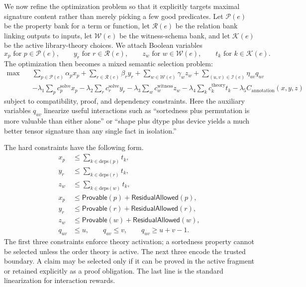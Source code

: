 \documentclass[11pt]{article}
\theoremstyle{definition}
\theoremstyle{plain}
\begin{document}
We now refine the optimization problem so that it explicitly targets maximal
signature content rather than merely picking a few good predicates. Let
\(\mathcal{P}(e)\) be the property bank for a term or function, let
\(\mathcal{R}(e)\) be the relation bank linking outputs to inputs, let
\(\mathcal{W}(e)\) be the witness-schema bank, and let
\(\mathcal{K}(e)\) be the active library-theory choices. We attach Boolean
variables
\[
 x_p \text{ for } p \in \mathcal{P}(e), \qquad
 y_r \text{ for } r \in \mathcal{R}(e), \qquad
 z_w \text{ for } w \in \mathcal{W}(e), \qquad
 t_k \text{ for } k \in \mathcal{K}(e).
\]
The optimization then becomes a mixed semantic selection problem:
\begin{align*}
\max \quad &
\sum_{p \in \mathcal{P}(e)} \alpha_p x_p
+ \sum_{r \in \mathcal{R}(e)} \beta_r y_r
+ \sum_{w \in \mathcal{W}(e)} \gamma_w z_w
+ \sum_{(u,v) \in \mathcal{I}(e)} \eta_{uv} q_{uv} \\
&- \lambda_1 \sum_p c^{\mathrm{solve}}_p x_p
- \lambda_2 \sum_r c^{\mathrm{solve}}_r y_r
- \lambda_3 \sum_w c^{\mathrm{witness}}_w z_w
- \lambda_4 \sum_k c^{\mathrm{theory}}_k t_k
- \lambda_5 C_{\mathrm{annotation}}(x,y,z)
\end{align*}
subject to compatibility, proof, and dependency constraints. Here the auxiliary
variables $q_{uv}$ linearize useful interactions such as ``sortedness plus
permutation is more valuable than either alone'' or ``shape plus dtype plus
device yields a much better tensor signature than any single fact in isolation.''

The hard constraints have the following form.
\begin{align*}
 x_p &\le \sum_{k \in \mathrm{deps}(p)} t_k, \\
 y_r &\le \sum_{k \in \mathrm{deps}(r)} t_k, \\
 z_w &\le \sum_{k \in \mathrm{deps}(w)} t_k, \\
 x_p &\le \mathsf{Provable}(p) + \mathsf{ResidualAllowed}(p), \\
 y_r &\le \mathsf{Provable}(r) + \mathsf{ResidualAllowed}(r), \\
 z_w &\le \mathsf{Provable}(w) + \mathsf{ResidualAllowed}(w), \\
 q_{uv} &\le u, \qquad q_{uv} \le v, \qquad q_{uv} \ge u + v - 1.
\end{align*}
The first three constraints enforce theory activation; a sortedness property
cannot be selected unless the order theory is active. The next three encode the
trusted boundary. A claim may be selected only if it can be proved in the active
fragment or retained explicitly as a proof obligation. The last line is the
standard linearization for interaction rewards.
\end{document}

